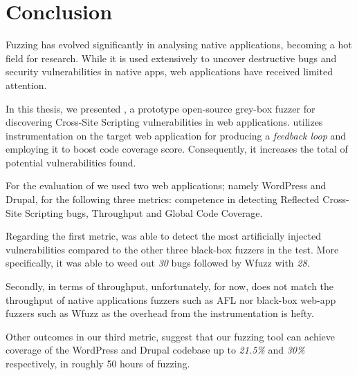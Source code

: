 \chapter{Conclusion}
\label{sec:conclusion}
\vspace*{0.25cm}

Fuzzing has evolved significantly in analysing native applications, becoming a hot field for research. While it is used extensively to uncover destructive bugs and security vulnerabilities in native apps, web applications have received limited attention.

In this thesis, we presented \pname{}, a prototype open-source grey-box fuzzer for discovering Cross-Site Scripting vulnerabilities in web applications. \pname{} utilizes instrumentation on the target web application for producing a \emph{feedback loop} and employing it to boost code coverage score. Consequently, it increases the total of potential vulnerabilities found.

For the evaluation of \pname{} we used two web applications; namely WordPress and Drupal, for the following three metrics: competence in detecting Reflected Cross-Site Scripting bugs, Throughput and Global Code Coverage.

Regarding the first metric, \pname{} was able to detect the most artificially injected vulnerabilities compared to the other three black-box fuzzers in the test. More specifically, it was able to weed out \emph{30} bugs followed by Wfuzz with \emph{28}.

Secondly, in terms of throughput, unfortunately, for now, \pname{} does not match the throughput of native applications fuzzers such as AFL nor black-box web-app fuzzers such as Wfuzz as the overhead from the instrumentation is hefty.

Other outcomes in our third metric, suggest that our fuzzing tool can achieve coverage of the WordPress and Drupal codebase up to \emph{21.5\%} and \emph{30\%} respectively, in roughly 50 hours of fuzzing.

